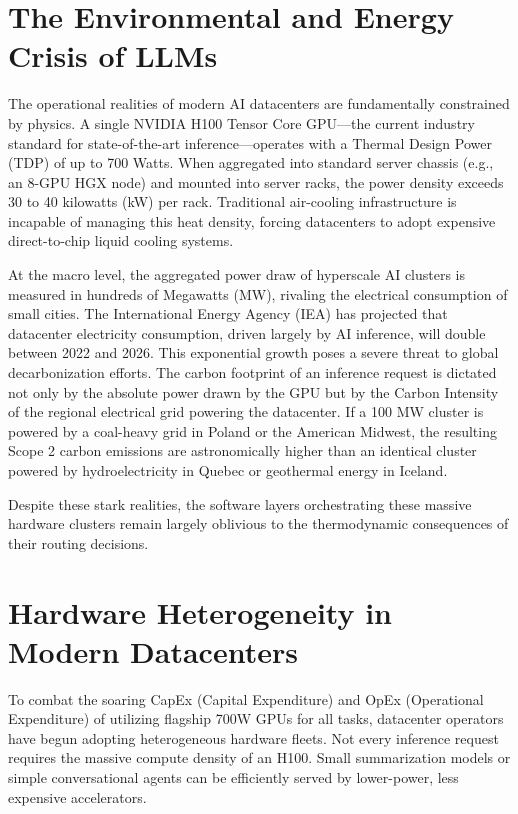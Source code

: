 \documentclass[12pt,a4paper,oneside]{report}
\begin{document}
\section{The Environmental and Energy Crisis of LLMs}
\label{sec:intro_energy_crisis}

The operational realities of modern AI datacenters are fundamentally constrained by physics. A single NVIDIA H100 Tensor Core GPU—the current industry standard for state-of-the-art inference—operates with a Thermal Design Power (TDP) of up to 700 Watts. When aggregated into standard server chassis (e.g., an 8-GPU HGX node) and mounted into server racks, the power density exceeds 30 to 40 kilowatts (kW) per rack. Traditional air-cooling infrastructure is incapable of managing this heat density, forcing datacenters to adopt expensive direct-to-chip liquid cooling systems. 

At the macro level, the aggregated power draw of hyperscale AI clusters is measured in hundreds of Megawatts (MW), rivaling the electrical consumption of small cities. The International Energy Agency (IEA) has projected that datacenter electricity consumption, driven largely by AI inference, will double between 2022 and 2026. This exponential growth poses a severe threat to global decarbonization efforts. The carbon footprint of an inference request is dictated not only by the absolute power drawn by the GPU but by the Carbon Intensity of the regional electrical grid powering the datacenter. If a 100 MW cluster is powered by a coal-heavy grid in Poland or the American Midwest, the resulting Scope 2 carbon emissions are astronomically higher than an identical cluster powered by hydroelectricity in Quebec or geothermal energy in Iceland. 

Despite these stark realities, the software layers orchestrating these massive hardware clusters remain largely oblivious to the thermodynamic consequences of their routing decisions.

\section{Hardware Heterogeneity in Modern Datacenters}
\label{sec:intro_heterogeneity}

To combat the soaring CapEx (Capital Expenditure) and OpEx (Operational Expenditure) of utilizing flagship 700W GPUs for all tasks, datacenter operators have begun adopting heterogeneous hardware fleets. Not every inference request requires the massive compute density of an H100. Small summarization models or simple conversational agents can be efficiently served by lower-power, less expensive accelerators.
\end{document}
